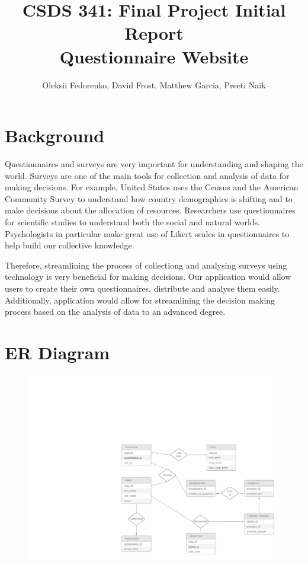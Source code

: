 \documentclass[12pt, oneside, a4paper]{article}
\title{CSDS 341: Final Project Initial Report\\ Questionnaire Website}
\author{Oleksii Fedorenko, David Frost, Matthew Garcia, Preeti Naik}
\begin{document}
    \maketitle
    \section{Background}
    Questionnaires and surveys are very important for understanding and shaping the world. Surveys are one of the main tools for collection and analysis of data for making decisions. For example, United States uses the Census and the American Community Survey to understand how country demographics is shifting and to make decisions about the allocation of resources. Researchers use questionnaires for scientific studies to understand both the social and natural worlds. Psychologists in particular make great use of Likert scales in questionnaires to help build our collective knowledge.
    
    Therefore, streamlining the process of collectiong and analysing surveys using technology is very beneficial for making decisions. Our application would allow users to create their own questionnaires, distribute and analyse them easily. Additionally, application would allow for streamlining the decision making process based on the analysis of data to an advanced degree.
    

    \newpage    
    \section{ER Diagram}

    \FloatBarrier
    \begin{figure}[H]
        \centerline{
        \includegraphics[width=\textwidth]{er_diagram.png}
        }
    \end{figure}
    
\end{document}
